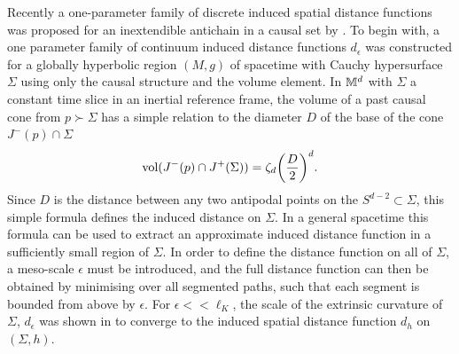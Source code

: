 Recently a one-parameter family of discrete  induced spatial distance functions was proposed for an inextendible antichain
in a causal set by \cite{esv}.   To begin with, a  one parameter family of continuum  induced distance functions
$d_\epsilon$ was constructed for a globally hyperbolic region $(M,g) $  of spacetime with Cauchy hypersurface
$\Sigma$ using  only the causal structure and the volume element. In  $\mathbb M^d$ with $\Sigma$ a constant time slice in
an inertial reference frame, 
the volume of a past causal cone from $p \succ \Sigma$ has a simple relation to the diameter $D$ of the base of the
cone $J^-(p)\cap \Sigma$
\begin{equation}
  \label{zetadef} 
\mathrm{vol}(J^-(p)\cap J^+(\Sigma))=\zeta_d \biggl(\frac{D}{2}\biggr)^d. 
\end{equation}
Since $D$ is the distance between any two antipodal points on the $S^{d-2}\subset \Sigma$,  this simple
formula defines the induced distance on $\Sigma$. In a general spacetime this
formula can be used to extract an approximate induced distance function in a sufficiently
small region of $\Sigma$.  In order to define the distance function on all of $\Sigma$, a meso-scale $\epsilon$
must be introduced, and the full distance function  can then be obtained by minimising over all segmented paths, such that each
segment is bounded from above by $\epsilon$.   For  $\epsilon
<<  \ell_K$, the scale of the extrinsic curvature of $\Sigma$,   $d_\epsilon$  was shown in \cite{esv} to converge to 
the induced spatial distance function $d_h$ on  $(\Sigma,h)$.

